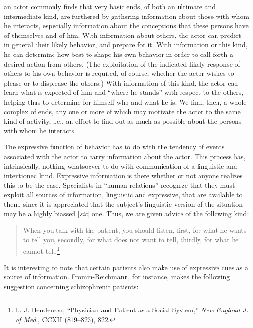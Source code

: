 \documentclass[twoside,symmetric,nobib,justified]{tufte-book}
\begin{document}
 an actor commonly finds that very basic ends, of both an
ultimate and intermediate kind, are furthered by gathering information
about those with whom he interacts, es­pecially information about the
conceptions that these persons have of themselves and of him. With
information about others, the actor can predict in general their likely
behavior, and pre­pare for it. With information or this kind, he can
determine how best to shape his own behavior in order to call forth a
desired action from others. (The exploitation of the indicated likely
response of others to his own behavior is required, of course, whether
the actor wishes to please or to displease the others.) With information
of this kind, the actor can learn what is expected of him and ``where he
stands'' with respect to the others, helping thus to determine for
himself who and what he is. We find, then, a whole complex of ends, any
one or more of which may motivate the actor to the same kind of
activity, i.e., an effort to find out as much as possible about the
persons with whom he interacts.

The expressive function of behavior has to do with the tendency of
events associated with the actor to carry information about the actor.
This process has, intrinsically, nothing whatsoever to do with
communication of a linguistic and intentioned kind. Expressive
information is there whether or not anyone realizes this to be the case.
Specialists in ``human relations'' recognize that they must exploit all
sources of information, linguistic and expressive, that are available to
them, since it is appreciated that the subject's linguistic version of
the situation may be a highly biassed {[}\emph{sic}{]} one. Thus, we are
given advice of the following kind:

\newpage

\begin{quote}
When you talk with the patient, you should listen, first, for what he
wants to tell you, secondly, for what does not want to tell, thirdly,
for what he cannot tell.\footnote{L. J. Henderson, ``Physician and
  Patient as a Social System,'' \emph{New England J. of Med.}, CCXII
  (819--823), 822.}
\end{quote}

\noindent It is interesting to note that certain patients also make use of
expressive cues as a source of information. Fromm-Reichmann, for
instance, makes the following suggestion concerning schizophrenic
patients:
\end{document}
